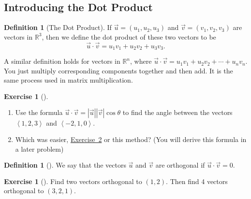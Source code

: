 \documentclass[10pt,]{book}
\theoremstyle{plain}
\theoremstyle{definition}
\newtheorem{definition}[theorem]{Definition}
\theoremstyle{definition}
\theoremstyle{definition}
\theoremstyle{definition}
\newtheorem{exploration}[project]{Exercise}
\theoremstyle{definition}
\numberwithin{equation}{section}
\newcommand{\lt}{<}
\begin{document}
\subsection[{Introducing the Dot Product}]{Introducing the Dot Product}\label{subsection-8}
\begin{definition}[{The Dot Product}]\label{dot_def}
If \(\vec u = (u_1,u_2,u_3)\) and \(\vec v= (v_1,v_2,v_3)\) are vectors in \(\mathbb{R}^3\), then we define the dot product of these two vectors to be%
\begin{equation*}
\vec u\cdot \vec v = u_1 v_1+ u_2 v_2+ u_3 v_3.
\end{equation*}
%
\par
A similar definition holds for vectors in \(\mathbb{R}^n\), where \(\vec u\cdot \vec v = u_1 v_1+ u_2 v_2+\cdots+ u_n v_n.\) You just multiply corresponding components together and then add. It is the same process used in matrix multiplication.%
\end{definition}
\begin{exploration}[]\label{prob_dot_angle_practice2}
\leavevmode%
\begin{enumerate}[font=\bfseries,label=(\alph*),ref=\alph*]
\item\label{task-60} Use the formula \(\vec u\cdot \vec v=|\vec u||\vec v|\cos\theta\) to find the angle between the vectors \(\left\lt 1,2,3\right>\) and \(\left\lt -2,1,0\right>\).%
\item\label{task-61} Which was easier, \hyperref[prob_dot_angle_practice]{Exercise~2} or this method?  (You will derive this formula in a later problem)%
\end{enumerate}
\end{exploration}
\begin{definition}[{}]\label{def_orthogonal}
We say that the vectors \(\vec u\) and \(\vec v\) are orthogonal if \(\vec u\cdot \vec v=0\).%
\end{definition}
\begin{exploration}[]\label{exploration-32}
Find two vectors orthogonal to \((1,2)\). Then find 4 vectors orthogonal to \((3,2,1)\).%
\end{exploration}
\typeout{************************************************}
\typeout{************************************************}
\end{document}
